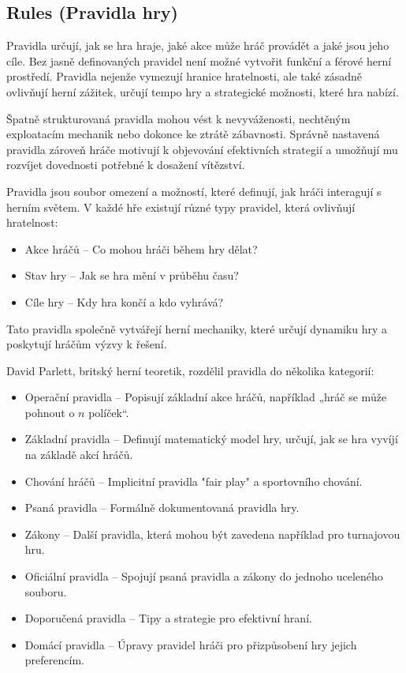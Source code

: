 \subsection{Rules (Pravidla hry)}

Pravidla určují, jak se hra hraje, jaké akce může hráč provádět a jaké jsou jeho cíle. Bez jasně definovaných pravidel není možné vytvořit funkční a férové herní prostředí. Pravidla nejenže vymezují hranice hratelnosti, ale také zásadně ovlivňují herní zážitek, určují tempo hry a strategické možnosti, které hra nabízí.

Špatně strukturovaná pravidla mohou vést k nevyváženosti, nechtěným exploatacím mechanik nebo dokonce ke ztrátě zábavnosti. Správně nastavená pravidla zároveň hráče motivují k objevování efektivních strategií a umožňují mu rozvíjet dovednosti potřebné k dosažení vítězství.


Pravidla jsou soubor omezení a možností, které definují, jak hráči interagují s herním světem. V každé hře existují různé typy pravidel, která ovlivňují hratelnost:

\begin{itemize}
    \item Akce hráčů -- Co mohou hráči během hry dělat?
    \item Stav hry -- Jak se hra mění v průběhu času?
    \item Cíle hry -- Kdy hra končí a kdo vyhrává?
\end{itemize}
Tato pravidla společně vytvářejí herní mechaniky, které určují dynamiku hry a poskytují hráčům výzvy k řešení.

David Parlett, britský herní teoretik, rozdělil pravidla do několika kategorií:

\begin{itemize}
    \item Operační pravidla -- Popisují základní akce hráčů, například „hráč se může pohnout o $n$ políček“.
    \item Základní pravidla -- Definují matematický model hry, určují, jak se hra vyvíjí na základě akcí hráčů.
    \item Chování hráčů -- Implicitní pravidla "fair play" a sportovního chování.
    \item Psaná pravidla -- Formálně dokumentovaná pravidla hry.
    \item Zákony -- Další pravidla, která mohou být zavedena například pro turnajovou hru.
    \item Oficiální pravidla -- Spojují psaná pravidla a zákony do jednoho uceleného souboru.
    \item Doporučená pravidla -- Tipy a strategie pro efektivní hraní.
    \item Domácí pravidla -- Úpravy pravidel hráči pro přizpůsobení hry jejich preferencím.
\end{itemize}


